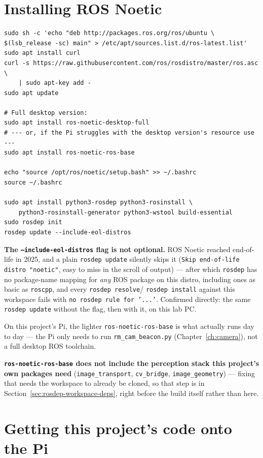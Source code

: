 \documentclass[11pt]{report}
\begin{document}
\section{Installing ROS Noetic}
\label{sec:install-ros}

\begin{lstlisting}[style=shell]
sudo sh -c 'echo "deb http://packages.ros.org/ros/ubuntu \
$(lsb_release -sc) main" > /etc/apt/sources.list.d/ros-latest.list'
sudo apt install curl
curl -s https://raw.githubusercontent.com/ros/rosdistro/master/ros.asc \
    | sudo apt-key add -
sudo apt update

# Full desktop version:
sudo apt install ros-noetic-desktop-full
# --- or, if the Pi struggles with the desktop version's resource use ---
sudo apt install ros-noetic-ros-base

echo "source /opt/ros/noetic/setup.bash" >> ~/.bashrc
source ~/.bashrc

sudo apt install python3-rosdep python3-rosinstall \
    python3-rosinstall-generator python3-wstool build-essential
sudo rosdep init
rosdep update --include-eol-distros
\end{lstlisting}

\textbf{The \texttt{--include-eol-distros} flag is not optional.} ROS
Noetic reached end-of-life in 2025, and a plain \texttt{rosdep update}
silently skips it (\texttt{Skip end-of-life distro "noetic"}, easy to miss
in the scroll of output) --- after which \texttt{rosdep} has no
package-name mapping for \emph{any} ROS package on this distro, including
ones as basic as \texttt{roscpp}, and every \texttt{rosdep resolve}/
\texttt{rosdep install} against this workspace fails with
\texttt{no rosdep rule for '...'}. Confirmed directly: the same
\texttt{rosdep update} without the flag, then with it, on this lab PC.

On this project's Pi, the lighter \texttt{ros-noetic-ros-base} is what
actually runs day to day --- the Pi only needs to run
\texttt{rm\_cam\_beacon.py} (Chapter~\ref{ch:camera}), not a full desktop
ROS toolchain.

\textbf{\texttt{ros-noetic-ros-base} does not include the perception stack
this project's own packages need} (\texttt{image\_transport},
\texttt{cv\_bridge}, \texttt{image\_geometry}) --- fixing that needs the
workspace to already be cloned, so that step is in
Section~\ref{sec:rosdep-workspace-deps}, right before the build itself
rather than here.

\section{Getting this project's code onto the Pi}
\label{sec:pi-code}
\end{document}
